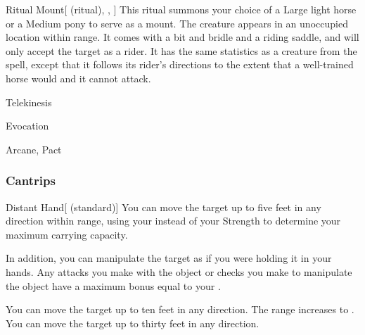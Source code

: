 \lowercase{\hypertarget{spell:Ritual Mount}{}}\label{spell:Ritual Mount}
\begin{attuneability}[Rank 3]{\hypertarget{spell:Ritual Mount}{Ritual Mount}}[ (ritual), , ]
This ritual summons your choice of a Large light horse or a Medium pony to serve as a mount.
The creature appears in an unoccupied location within \rngclose range.
It comes with a bit and bridle and a riding saddle, and will only accept the target as a rider.
It has the same statistics as a creature from the  spell, except that it follows its rider's directions to the extent that a well-trained horse would and it cannot attack.
\end{attuneability}
\vspace{0.25em}


\newpage
\begin{spellsection}{Telekinesis}

\begin{spellheader}
\end{spellheader}


 Evocation

 Arcane, Pact

\subsubsection{Cantrips}


\begin{freeability}{Distant Hand}[ (standard)]
You can move the target up to five feet in any direction within range, using your  instead of your Strength to determine your maximum carrying capacity.

In addition, you can manipulate the target as if you were holding it in your hands.
Any attacks you make with the object or checks you make to manipulate the object have a maximum bonus equal to your .

\rankline
{} You can move the target up to ten feet in any direction.
 The range increases to \rngmed.
 You can move the target up to thirty feet in any direction.
\end{freeability}

\end{spellsection}


